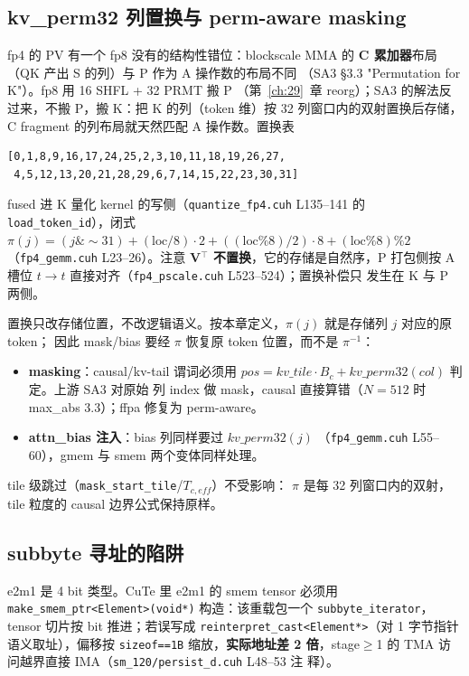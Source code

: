 \subsection{kv\_perm32 列置换与 perm-aware masking}

fp4 的 PV 有一个 fp8 没有的结构性错位：blockscale MMA 的
\textbf{C 累加器}布局（QK 产出 S 的列）与 P 作为 A 操作数的布局不同
（SA3 §3.3 "Permutation for K"）。fp8 用 16 SHFL + 32 PRMT 搬 P
（第~\ref{ch:29}~章 reorg）；SA3 的解法反过来，不搬 P，搬
K：把 K 的列（token 维）按 32 列窗口内的双射置换后存储，C fragment
的列布局就天然匹配 A 操作数。置换表
\begin{lstlisting}[style=console]
[0,1,8,9,16,17,24,25,2,3,10,11,18,19,26,27,
 4,5,12,13,20,21,28,29,6,7,14,15,22,23,30,31]
\end{lstlisting}
fused 进 K 量化 kernel 的写侧（\texttt{quantize\_fp4.cuh}
L135--141 的 \texttt{load\_token\_id}），闭式
$\pi(j)=(j\&\sim31)+(\mathrm{loc}/8)\cdot2+((\mathrm{loc}\%8)/2)\cdot8+
(\mathrm{loc}\%8)\%2$（\texttt{fp4\_gemm.cuh} L23--26）。注意
\textbf{V$^\top$ 不置换}，它的存储是自然序，P 打包侧按 A 槽位
$t\to t$ 直接对齐（\texttt{fp4\_pscale.cuh} L523--524）；置换补偿只
发生在 K 与 P 两侧。

置换只改存储位置，不改逻辑语义。按本章定义，$\pi(j)$ 就是存储列 $j$ 对应的原 token；
因此 mask/bias 要经 $\pi$ 恢复原 token 位置，而不是 $\pi^{-1}$：
\begin{itemize}[itemsep=0pt,topsep=2pt]
  \item \textbf{masking}：causal/kv-tail 谓词必须用
        $pos=kv\_tile\cdot B_c+kv\_perm32(col)$ 判定。上游 SA3 对原始
        列 index 做 mask，causal 直接算错（$N{=}512$ 时 max\_abs
        3.3）；ffpa 修复为 perm-aware。
  \item \textbf{attn\_bias 注入}：bias 列同样要过 $kv\_perm32(j)$
        （\texttt{fp4\_gemm.cuh} L55--60），gmem 与 smem 两个变体同样处理。
\end{itemize}

tile 级跳过（\texttt{mask\_start\_tile}/$T_{c,eff}$）不受影响：
$\pi$ 是每 32 列窗口内的双射，tile 粒度的 causal 边界公式保持原样。

\subsection{subbyte 寻址的陷阱}

e2m1 是 4 bit 类型。CuTe 里 e2m1 的 smem tensor 必须用
\texttt{make\_smem\_ptr<Element>(void*)} 构造：该重载包一个
\texttt{subbyte\_iterator}，tensor 切片按 bit 推进；若误写成
\texttt{reinterpret\_cast<Element*>}（对 1 字节指针语义取址），偏移按
\texttt{sizeof==1B} 缩放，\textbf{实际地址差 2 倍}，stage$\ge$1 的
TMA 访问越界直接 IMA（\texttt{sm\_120/persist\_d.cuh} L48--53 注
释）。

